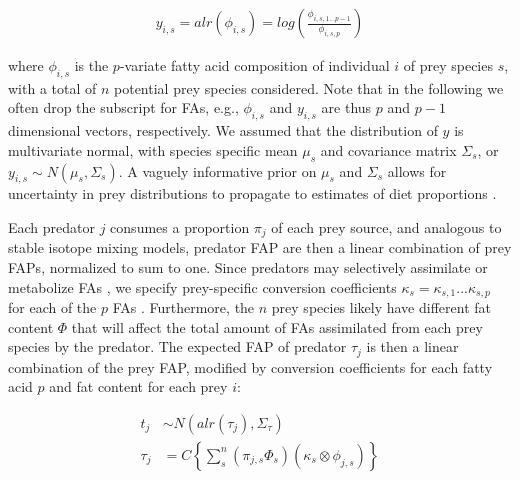 \documentclass[fleqn,10pt]{wlpeerj}
\begin{document}
\begin{align}
y_{i,s} = alr(\phi_{i,s}) = log \left( \frac{\phi_{i,s,1...p-1}}{\phi_{i,s,p}} \right)
\end{align}

where $\phi_{i,s}$ is the $p$-variate fatty acid composition of individual
$i$ of prey species $s$, with a total of $n$ potential prey species
considered. Note that in the following we often drop the subscript for
FAs, e.g., $\phi_{i,s}$ and $y_{i,s}$ are thus $p$ and $p-1$
dimensional vectors, respectively. We assumed that the distribution of $y$ is
multivariate normal, with species specific mean $\mu_s$ and covariance matrix $\Sigma_s$,
or $y_{i,s} \sim N(\mu_s,\Sigma_s)$. A vaguely informative prior on
$\mu_s$ and $\Sigma_s$ allows for uncertainty in prey distributions to propagate to estimates of diet proportions \citep{ward_including_2010}.

Each predator $j$ consumes a proportion $\pi_j$ of each prey source, and
analogous to stable isotope mixing models, predator FAP are then a
linear combination of prey FAPs, normalized to sum to one. Since predators may selectively assimilate or metabolize FAs
\citep{iverson_quantitative_2004,budge_studying_2006,rosen_effects_2012},
we specify prey-specific conversion coefficients $\kappa_{s}
= \kappa_{s,1}...\kappa_{s,p}$ for each of the $p$ FAs \citep{rosen_effects_2012}. Furthermore,
the $n$ prey species likely have different fat content $\Phi$
that will affect the total amount of FAs assimilated from each
prey species by the
predator. The expected FAP of predator $\tau_j$ is then a linear combination of the prey
FAP, modified by conversion coefficients for each fatty acid $p$ and fat
content for each prey $i$:

\begin{align}
t_j &\sim N(alr(\tau_{j}),\Sigma_{\tau})\label{eq:2}\\
\tau_{j} &= C \left\{ \sum_{s}^n  \left(\pi_{j,s} \Phi_{s} \right) \left(
    \kappa_{s} \otimes \phi_{j,s} \right) \right\}\label{eq:3}
\end{align}
\end{document}
